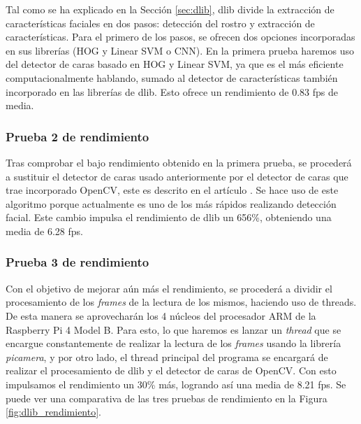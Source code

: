 Tal como se ha explicado en la Sección \ref{sec:dlib}, dlib divide la extracción de características faciales en dos pasos: detección del rostro y extracción de características. Para el primero de los pasos, se ofrecen dos opciones incorporadas en sus librerías (HOG y Linear SVM o CNN). En la primera prueba haremos uso del detector de caras basado en HOG y Linear SVM, ya que es el más eficiente computacionalmente hablando, sumado al detector de características también incorporado en las librerías de dlib. Esto ofrece un rendimiento de 0.83 fps de media.

\subsubsection{Prueba 2 de rendimiento}

Tras comprobar el bajo rendimiento obtenido en la primera prueba, se procederá a sustituir el detector de caras usado anteriormente por el detector de caras que trae incorporado OpenCV, este es descrito en el artículo \cite{opencv_haar_cascade}. Se hace uso de este algoritmo porque actualmente es uno de los más rápidos realizando detección facial. Este cambio impulsa el rendimiento de dlib un 656\%, obteniendo una media de 6.28 fps.

\subsubsection{Prueba 3 de rendimiento}
Con el objetivo de mejorar aún más el rendimiento, se procederá a dividir el procesamiento de los \textit{frames} de la lectura de los mismos, haciendo uso de threads. De esta manera se aprovecharán los 4 núcleos del procesador ARM de la Raspberry Pi 4 Model B. Para esto, lo que haremos es lanzar un \textit{thread} que se encargue constantemente de realizar la lectura de los \textit{frames} usando la librería \textit{picamera}, y por otro lado, el thread principal del programa se encargará de realizar el procesamiento de dlib y el detector de caras de OpenCV. Con esto impulsamos el rendimiento un 30\% más, logrando así una media de 8.21 fps. Se puede ver una comparativa de las tres pruebas de rendimiento en la Figura \ref{fig:dlib_rendimiento}.

